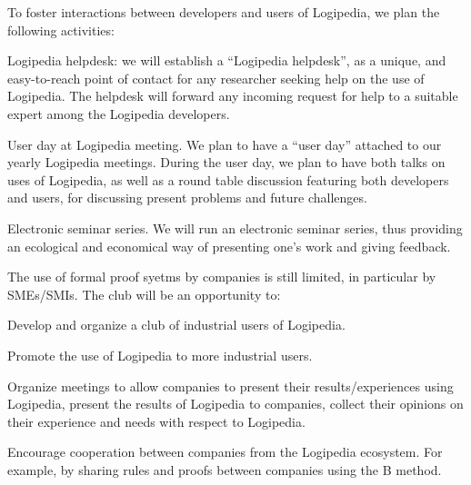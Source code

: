 \begin{workpackage}[id=dissemination,type=MGT,wphases=1-48,
  short={Dissemination},
  title={Dissemination, communication and exploitation},
  lead=Inr,InrRM=12,BirRM=4,InrRM=4,ImtRM=2,StrRM=2,ZibRM=14,EduRM=12]
\begin{tasklist}
  \begin{task}[id=researchers-club,
      title=Expanding the use of Logipedia in research,
      lead=Bir,BirRM=2,wphases=1-48!.05]
     To foster interactions between developers and users of Logipedia, we plan the following activities:
    \begin{compactitem}
     \item Logipedia helpdesk:
    we will establish a ``Logipedia helpdesk'', as a unique, and easy-to-reach point of contact for any researcher seeking help on the use of Logipedia.
     The helpdesk will forward any incoming request for help to a suitable expert among the Logipedia developers.
     \item User day at Logipedia meeting.
     We plan to have a ``user day'' attached to our yearly Logipedia meetings.
     During the user day, we plan to have both talks on uses of Logipedia, as well as a round table discussion featuring both developers and users, for discussing present problems and future challenges.
     \item Electronic seminar series.
     We will run an electronic seminar series, thus providing an ecological and economical way of presenting one's work and giving feedback.
    \end{compactitem}
  \end{task}

  \begin{task}[id=industrial-club,
    title=Expanding the use of Logipedia in the industry,
    lead=Inr,InrRM=2,wphases=1-48!.05]

    The use of formal proof syetms by companies is still limited, in particular by SMEs/SMIs. The club will be an opportunity to:
    \begin{compactitem}
    \item Develop and organize a club of industrial users of Logipedia.
    \item Promote the use of Logipedia to more industrial users.
    \item Organize meetings to allow companies to present their results/experiences using Logipedia, present the results of Logipedia to companies, collect their opinions on their experience and needs with respect to Logipedia.
    \item Encourage cooperation between companies from the Logipedia
      ecosystem. For example, by sharing rules and proofs between companies using the B method.
    \end{compactitem}
  \end{task}


\end{tasklist}
\end{workpackage}

